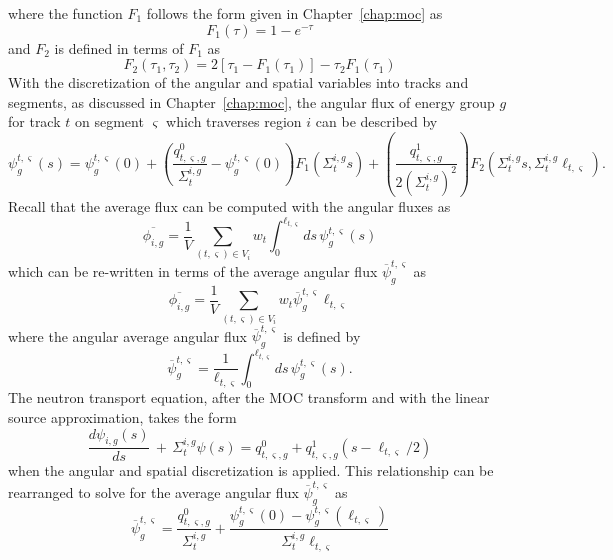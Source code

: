 where the function $F_1$ follows the form given in Chapter~\ref{chap:moc} as
\begin{equation*}
F_1(\tau) = 1 - e^{-\tau}
\end{equation*}
and $F_2$ is defined in terms of $F_1$ as
\begin{equation}
F_2(\tau_1, \tau_2) = 2 \left[\tau_1 - F_1(\tau_1)\right] - \tau_2 F_1(\tau_1)
\end{equation}
With the discretization of the angular and spatial variables into tracks and segments, as discussed in Chapter~\ref{chap:moc}, the angular flux of energy group $g$ for track $t$ on segment $\varsigma$ which traverses region $i$ can be described by
\begin{equation}
	\psi_g^{t,\varsigma}(s) = \psi^{t,\varsigma}_g(0) + \left( \frac{q^0_{t,\varsigma,g}}{\Sigma_{t}^{i,g}} - \psi_g^{t,\varsigma}(0) \right) F_1\left(\Sigma_{t}^{i,g} s \right) + \left(\frac{q^1_{t,\varsigma,g}}{2\left(\Sigma_{t}^{i,g}\right)^2}\right) F_2\left(\Sigma_{t}^{i,g} s, \Sigma_{t}^{i,g} \ell_{t,\varsigma} \right).
\label{eq:ls-angular-flux}
\end{equation}
Recall that the average flux can be computed with the angular fluxes as
\begin{equation}
	\overline{\phi_{i,g}} = \frac{1}{V} \sum_{(t,\varsigma) \in V_i} w_t \int_{0}^{\ell_{t,\varsigma}} ds \, \psi^{t,\varsigma}_g(s)
\end{equation}
which can be re-written in terms of the average angular flux $\overline{\psi}^{t,\varsigma}_g$ as
\begin{equation}
	\overline{\phi_{i,g}} = \frac{1}{V} \sum_{(t,\varsigma) \in V_i} w_t \overline{\psi}^{t,\varsigma}_g \ell_{t,\varsigma}
\end{equation}
where the angular average angular flux $\overline{\psi}^{t,\varsigma}_g$ is defined by
\begin{equation}
\overline{\psi}^{t,\varsigma}_g = \frac{1}{\ell_{t,\varsigma}}\int_{0}^{\ell_{t,\varsigma}} ds \, \psi^{t,\varsigma}_g(s).
\end{equation}
The neutron transport equation, after the MOC transform and with the linear source approximation, takes the form
\begin{equation}
	\frac{d\psi_{i,g}(s)}{ds} \, + \, \Sigma_{t}^{i,g} \psi(s) = q^0_{t,\varsigma,g} + q^1_{t,\varsigma,g}(s-\ell_{t,\varsigma}/2)
\end{equation}
when the angular and spatial discretization is applied. This relationship can be rearranged to solve for the average angular flux $\overline{\psi}^{t,\varsigma}_g$ as
\begin{equation}
\overline{\psi}^{t,\varsigma}_g = \frac{q^0_{t,\varsigma,g}}{\Sigma_{t}^{i,g}} + \frac{\psi^{t,\varsigma}_g(0) - \psi^{t,\varsigma}_g(\ell_{t,\varsigma})}{\Sigma_{t}^{i,g} \ell_{t,\varsigma}}
\label{eq:ls-avg-angular-flux}
\end{equation}

